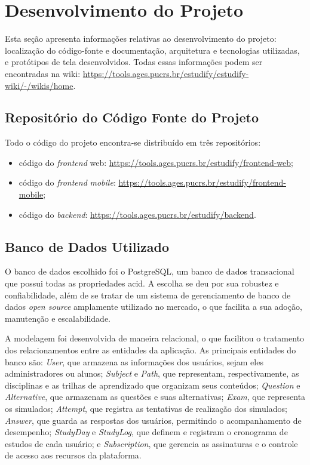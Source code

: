 \section[Desenvolvimento do Projeto]{Desenvolvimento do Projeto}

Esta seção apresenta informações relativas ao desenvolvimento do projeto: localização do código-fonte e documentação, arquitetura e tecnologias utilizadas, e protótipos de tela desenvolvidos. Todas essas informações podem ser encontradas na wiki: \url{https://tools.ages.pucrs.br/estudify/estudify-wiki/-/wikis/home}.

\subsection{Repositório do Código Fonte do Projeto}
  Todo o código do projeto encontra-se distribuído em três repositórios:
\begin{itemize}
    \item código do \textit{frontend} web: \url{https://tools.ages.pucrs.br/estudify/frontend-web};
    \item código do \textit{frontend} \textit{mobile}: \url{https://tools.ages.pucrs.br/estudify/frontend-mobile};
    \item código do \textit{backend}: \url{https://tools.ages.pucrs.br/estudify/backend}.
\end{itemize}

\subsection{Banco de Dados Utilizado}
  O banco de dados escolhido foi o PostgreSQL, um banco de dados transacional que possui todas as propriedades \ac{acid}. A escolha se deu por sua robustez e confiabilidade, além de se tratar de um sistema de gerenciamento de banco de dados \textit{open source} amplamente utilizado no mercado, o que facilita a sua adoção, manutenção e escalabilidade.

  A modelagem foi desenvolvida de maneira relacional, o que facilitou o tratamento dos relacionamentos entre as entidades da aplicação. As principais entidades do banco são: \textit{User}, que armazena as informações dos usuários, sejam eles administradores ou alunos; \textit{Subject} e \textit{Path}, que representam, respectivamente, as disciplinas e as trilhas de aprendizado que organizam seus conteúdos; \textit{Question} e \textit{Alternative}, que armazenam as questões e suas alternativas; \textit{Exam}, que representa os simulados; \textit{Attempt}, que registra as tentativas de realização dos simulados; \textit{Answer}, que guarda as respostas dos usuários, permitindo o acompanhamento de desempenho; \textit{StudyDay} e \textit{StudyLog}, que definem e registram o cronograma de estudos de cada usuário; e \textit{Subscription}, que gerencia as assinaturas e o controle de acesso aos recursos da plataforma.


